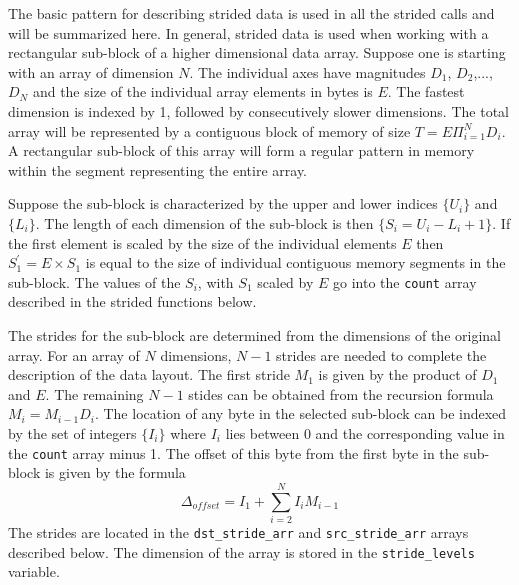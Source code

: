 \documentclass[12pt]{article}
\begin{document}
The basic pattern for describing strided data is used in all the strided calls
and will be summarized here. In general, strided data is used when
working with a rectangular sub-block of a higher dimensional data array. Suppose
one is starting with an array of dimension $N$. The individual axes have
magnitudes $D_1$, $D_2$,..., $D_N$ and the size of the individual array elements
in bytes is $E$. The fastest dimension is indexed by 1, followed by
consecutively slower dimensions. The total array will be represented by a contiguous
block of memory of size $T=E\Pi_{i=1}^{N}D_i$. A rectangular sub-block of this
array will form a regular pattern in memory within the segment representing the
entire array.

Suppose the sub-block is characterized by the upper and lower indices $\{U_i\}$
and $\{L_i\}$. The length of each dimension of the sub-block is then
$\{S_i=U_i-L_i+1\}$. If the first element is scaled by the size of the
individual elements $E$ then $S_1^{\prime} = E\times S_1$ is equal to the size of individual
contiguous memory segments in the sub-block. The values of the $S_i$, with $S_1$
scaled by $E$ go into the \texttt{count} array described in the strided
functions below.

The strides for the sub-block are determined from the dimensions of the original
array. For an array of $N$ dimensions, $N-1$ strides are needed to complete the
description of the data layout. The first stride $M_1$ is given by the product
of $D_1$ and $E$. The remaining $N-1$ stides can be obtained from the recursion
formula $M_i = M_{i-1}D_i$. The location of any byte in the selected sub-block can
be indexed by the set of integers $\{I_i\}$ where $I_i$ lies between 0 and the
corresponding value in the \texttt{count} array minus 1. The offset of this byte
from the first byte in the sub-block is given by the formula
\[ \Delta_{offset} = I_1 + \sum_{i=2}^{N}I_i M_{i-1} \]
The strides are located in the \texttt{dst\_stride\_arr} and
\texttt{src\_stride\_arr} arrays described below. The dimension of the array is
stored in the \texttt{stride\_levels} variable.
\end{document}
